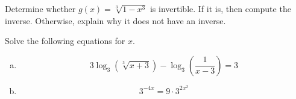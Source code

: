 \documentclass[12pt]{amsart}
\begin{document}
\newpage

\begin{thm}[20 Points]\label{ex4}
  Determine whether $g(x) = \sqrt[3]{1-x^3}$ is invertible.
  If it is, then compute the inverse.  
  Otherwise, explain why it does not have an inverse.
\end{thm}

\newpage

\begin{thm}[20 Points]\label{ex5}
  Solve the following equations for $x$.
  \begin{enumerate}[(a)]
  \item
    $$ 3\log_3(\sqrt[3]{x + 3}) - \log_3\left(\frac{1}{x - 3}\right) = 3 $$
    \vspace{3.5in}
  \item
    $$3^{-4x} = 9 \cdot 3^{2x^2}$$
  \end{enumerate}
\end{thm}
\end{document}
